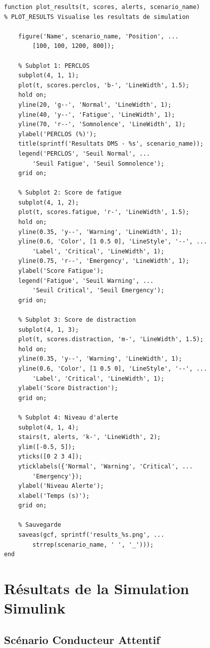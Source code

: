 \documentclass[12pt,a4paper,twoside]{report}
\begin{document}
\begin{lstlisting}[style=matlabstyle, caption={Fonction de visualisation des résultats.}, label={lst:plot_results}]
function plot_results(t, scores, alerts, scenario_name)
% PLOT_RESULTS Visualise les resultats de simulation
    
    figure('Name', scenario_name, 'Position', ...
        [100, 100, 1200, 800]);
    
    % Subplot 1: PERCLOS
    subplot(4, 1, 1);
    plot(t, scores.perclos, 'b-', 'LineWidth', 1.5);
    hold on;
    yline(20, 'g--', 'Normal', 'LineWidth', 1);
    yline(40, 'y--', 'Fatigue', 'LineWidth', 1);
    yline(70, 'r--', 'Somnolence', 'LineWidth', 1);
    ylabel('PERCLOS (%)');
    title(sprintf('Resultats DMS - %s', scenario_name));
    legend('PERCLOS', 'Seuil Normal', ...
        'Seuil Fatigue', 'Seuil Somnolence');
    grid on;
    
    % Subplot 2: Score de fatigue
    subplot(4, 1, 2);
    plot(t, scores.fatigue, 'r-', 'LineWidth', 1.5);
    hold on;
    yline(0.35, 'y--', 'Warning', 'LineWidth', 1);
    yline(0.6, 'Color', [1 0.5 0], 'LineStyle', '--', ...
        'Label', 'Critical', 'LineWidth', 1);
    yline(0.75, 'r--', 'Emergency', 'LineWidth', 1);
    ylabel('Score Fatigue');
    legend('Fatigue', 'Seuil Warning', ...
        'Seuil Critical', 'Seuil Emergency');
    grid on;
    
    % Subplot 3: Score de distraction
    subplot(4, 1, 3);
    plot(t, scores.distraction, 'm-', 'LineWidth', 1.5);
    hold on;
    yline(0.35, 'y--', 'Warning', 'LineWidth', 1);
    yline(0.6, 'Color', [1 0.5 0], 'LineStyle', '--', ...
        'Label', 'Critical', 'LineWidth', 1);
    ylabel('Score Distraction');
    grid on;
    
    % Subplot 4: Niveau d'alerte
    subplot(4, 1, 4);
    stairs(t, alerts, 'k-', 'LineWidth', 2);
    ylim([-0.5, 5]);
    yticks([0 2 3 4]);
    yticklabels({'Normal', 'Warning', 'Critical', ...
        'Emergency'});
    ylabel('Niveau Alerte');
    xlabel('Temps (s)');
    grid on;
    
    % Sauvegarde
    saveas(gcf, sprintf('results_%s.png', ...
        strrep(scenario_name, ' ', '_')));
end
\end{lstlisting}

\section{Résultats de la Simulation Simulink}

\subsection{Scénario Conducteur Attentif}
\end{document}
